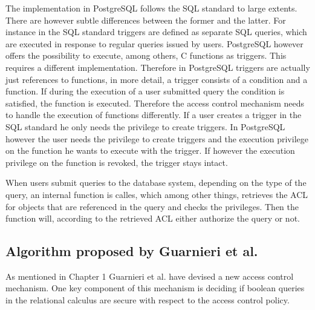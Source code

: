 The implementation in PostgreSQL follows the SQL standard to large extents. 
%
There are however subtle differences between the former and the latter.
%
For instance in the SQL standard triggers are defined as separate SQL queries, which are executed in response to regular queries issued by users.
%
PostgreSQL however offers the possibility to execute, among others, C functions as triggers.
%
This requires a different implementation.
%
Therefore in PostgreSQL triggers are actually just references to functions, in more detail, a trigger consists of a condition and a function.
%
If during the execution of a user submitted query the condition is satisfied, the function is executed.
%
Therefore the access control mechanism needs to handle the execution of functions differently.
%
If a user creates a trigger in the SQL standard he only needs the privilege to create triggers.
%
In PostgreSQL however the user needs the privilege to create triggers and the execution privilege on the function he wants to execute with the trigger.
%
If however the execution privilege on the function is revoked, the trigger stays intact.

When users submit queries to the database system, depending on the type of the query, an internal function is calles, which among other things, retrieves the ACL for objects that are referenced in the query and checks the privileges.
%
Then the function will, according to the retrieved ACL either authorize the query or not.

\subsection{Algorithm proposed by Guarnieri et al.}

As mentioned in Chapter 1 Guarnieri et al. have devised a new access control mechanism.
%
One key component of this mechanism is deciding if boolean queries in the relational calculus are secure with respect to the access control policy.
%
%
